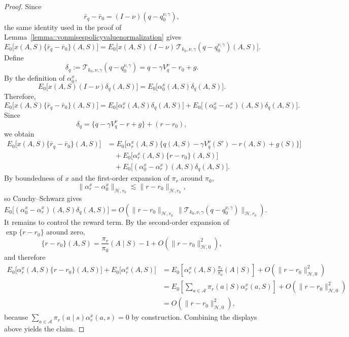 \documentclass[11pt]{article}
\theoremstyle{plain}
\begin{document}
\begin{proof}
Since
\[
\bar r_q - \bar r_0
=
(I-\nu)(q-q_0^{\nu,\gamma}),
\]
the same identity used in the proof of
Lemma~\ref{lemma::vonmisespolicyvaluenormalization} gives
\[
E_0\!\big[x(A,S)\{\bar r_q - \bar r_0\}(A,S)\big]
=
E_0\!\big[x(A,S)(I-\nu)\,
\mathcal T_{k_0,\nu,\gamma}(q-q_0^{\nu,\gamma})(A,S)\big].
\]
Define
\[
\delta_q
:=
\mathcal T_{k_0,\nu,\gamma}(q-q_0^{\nu,\gamma})
=
q - \gamma V_q^\nu - r_0 + g.
\]
By the definition of \(\alpha_0^x\),
\[
E_0\!\big[x(A,S)(I-\nu)\delta_q(A,S)\big]
=
E_0\!\big[\alpha_0^x(A,S)\delta_q(A,S)\big].
\]
Therefore,
\[
E_0\!\big[x(A,S)\{\bar r_q - \bar r_0\}(A,S)\big]
=
E_0\!\big[\alpha_r^x(A,S)\delta_q(A,S)\big]
+ E_0\!\big[(\alpha_0^x-\alpha_r^x)(A,S)\delta_q(A,S)\big].
\]
Since
\[
\delta_q
=
\{q - \gamma V_q^\nu - r + g\} + (r-r_0),
\]
we obtain
\[
\begin{aligned}
E_0\!\big[x(A,S)\{\bar r_q - \bar r_0\}(A,S)\big]
&=
E_0\!\big[\alpha_r^x(A,S)\{q(A,S)-\gamma V_q^\nu(S')-r(A,S)+g(S)\}\big] \\
&\quad
+ E_0\!\big[\alpha_r^x(A,S)\{r-r_0\}(A,S)\big] \\
&\quad
+ E_0\!\big[(\alpha_0^x-\alpha_r^x)(A,S)\delta_q(A,S)\big].
\end{aligned}
\]
By boundedness of \(x\) and the first-order expansion of \(\pi_r\) around
\(\pi_0\),
\[
\|\alpha_r^x - \alpha_0^x\|_{\mathcal H,r_0}
\lesssim
\|r-r_0\|_{\mathcal H,r_0},
\]
so Cauchy--Schwarz gives
\[
E_0\!\big[(\alpha_0^x-\alpha_r^x)(A,S)\delta_q(A,S)\big]
=
O\!\left(
\|r-r_0\|_{\mathcal H,r_0}\,
\bigl\|\mathcal T_{k_0,\nu,\gamma}(q-q_0^{\nu,\gamma})\bigr\|_{\mathcal H,r_0}
\right).
\]
It remains to control the reward term. By the second-order expansion of
\(\exp\{r-r_0\}\) around zero,
\[
\{r-r_0\}(A,S)
=
\frac{\pi_r}{\pi_0}(A\mid S)-1
+ O\!\left(\|r-r_0\|_{\mathcal H,0}^2\right),
\]
and therefore
\[
\begin{aligned}
E_0\!\big[\alpha_r^x(A,S)\{r-r_0\}(A,S)\big]
+ E_0\!\big[\alpha_r^x(A,S)\big]
&=
E_0\!\left[\alpha_r^x(A,S)\frac{\pi_r}{\pi_0}(A\mid S)\right]
+ O\!\left(\|r-r_0\|_{\mathcal H,0}^2\right) \\
&=
E_0\!\left[\sum_{a \in \mathcal A}\pi_r(a\mid S)\alpha_r^x(a,S)\right]
+ O\!\left(\|r-r_0\|_{\mathcal H,0}^2\right) \\
&=
O\!\left(\|r-r_0\|_{\mathcal H,0}^2\right),
\end{aligned}
\]
because \(\sum_{a \in \mathcal A}\pi_r(a\mid s)\alpha_r^x(a,s)=0\) by
construction. Combining the displays above yields the claim.
\end{proof}
\end{document}

